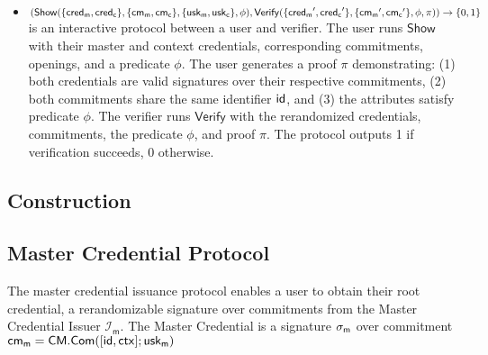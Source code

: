 \begin{definition}
\begin{itemize}
    \item $(\mathsf{Show}(\{\mathsf{cred_m}, \mathsf{cred_c}\}, \{\mathsf{cm_m}, \mathsf{cm_c}\}, \{\mathsf{usk_m}, \mathsf{usk_c}\}, \phi), \mathsf{Verify}(\{\mathsf{cred_m}', \mathsf{cred_c}'\}, \{\mathsf{cm_m}', \mathsf{cm_c}'\}, \phi, \pi)) \rightarrow \{0,1\}$ is an interactive protocol between a user and verifier. The user runs $\mathsf{Show}$ with their master and context credentials, corresponding commitments, openings, and a predicate $\phi$. The user generates a proof $\pi$ demonstrating: (1) both credentials are valid signatures over their respective commitments, (2) both commitments share the same identifier $\mathsf{id}$, and (3) the attributes satisfy predicate $\phi$. The verifier runs $\mathsf{Verify}$ with the rerandomized credentials, commitments, the predicate $\phi$, and proof $\pi$. The protocol outputs 1 if verification succeeds, 0 otherwise.
    \end{itemize}
\end{definition}

\subsection{Construction}
\subsection{Master Credential Protocol}
The master credential issuance protocol enables a user to obtain their root credential, a rerandomizable signature over commitments from the Master Credential Issuer $\mathcal{I}_{\mathsf{m}}.$ The Master Credential is a signature $\sigma_{\mathsf{m}}$ over commitment $\mathsf{cm_m} = \mathsf{CM.Com}([\mathsf{id}, \mathsf{ctx}]; \mathsf{usk_m})$


